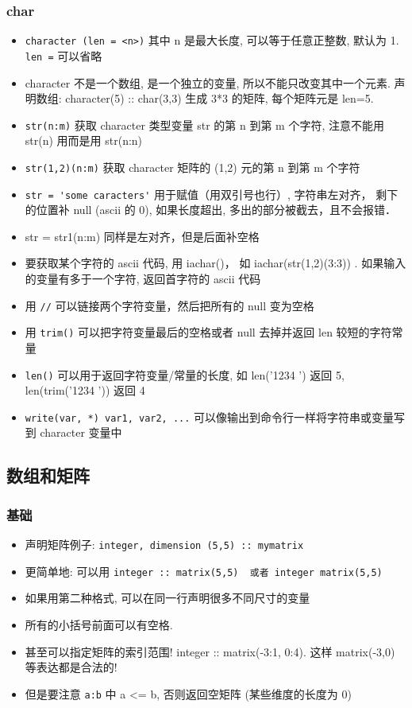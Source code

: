 \subsubsection{char}
\begin{itemize}
\item \verb`character (len = <n>)` 其中 n 是最大长度, 可以等于任意正整数, 默认为 1.  \verb`len =` 可以省略
\item character 不是一个数组, 是一个独立的变量, 所以不能只改变其中一个元素. 声明数组: character(5) :: char(3,3) 生成 3*3 的矩阵, 每个矩阵元是 len=5.
\item \verb`str(n:m)` 获取 character 类型变量 str 的第 n 到第 m 个字符, 注意不能用 str(n) 用而是用 str(n:n)
\item \verb`str(1,2)(n:m)` 获取 character 矩阵的 (1,2) 元的第 n 到第 m 个字符
\item \verb`str = 'some caracters'` 用于赋值（用双引号也行）, 字符串左对齐， 剩下的位置补 null (ascii 的 0), 如果长度超出, 多出的部分被截去，且不会报错．
\item str = str1(n:m) 同样是左对齐，但是后面补空格
\item 要获取某个字符的 ascii 代码, 用 iachar()， 如 iachar(str(1,2)(3:3)) . 如果输入的变量有多于一个字符, 返回首字符的 ascii 代码
\item 用 \verb`//` 可以链接两个字符变量，然后把所有的 null 变为空格
\item 用 \verb`trim()` 可以把字符变量最后的空格或者 null 去掉并返回 len 较短的字符常量
\item \verb`len()` 可以用于返回字符变量/常量的长度, 如 len('1234 ') 返回 5, len(trim('1234 ')) 返回 4
\item \verb`write(var, *) var1, var2, ...` 可以像输出到命令行一样将字符串或变量写到 character 变量中
\end{itemize}

\subsection{数组和矩阵}
\subsubsection{基础}
\begin{itemize}
\item 声明矩阵例子:  \verb`integer, dimension (5,5) :: mymatrix`
\item 更简单地: 可以用 \verb`integer :: matrix(5,5)  或者 integer matrix(5,5)`
\item 如果用第二种格式, 可以在同一行声明很多不同尺寸的变量
\item 所有的小括号前面可以有空格.
\item 甚至可以指定矩阵的索引范围!   integer :: matrix(-3:1, 0:4). 这样 matrix(-3,0) 等表达都是合法的!
\item 但是要注意 \verb`a:b` 中 a <= b, 否则返回空矩阵 (某些维度的长度为 0)
\end{itemize}

